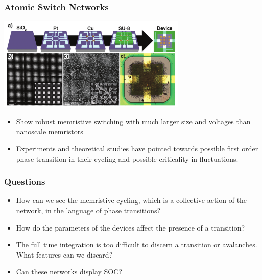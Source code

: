 \documentclass[mathserif]{beamer}
\begin{document}
\begin{frame}
\frametitle{Atomic Switch Networks}

\begin{center}
\includegraphics[width=9cm]{ASN_fabrication.png}
\end{center}
\begin{itemize}
\item Show robust memristive switching with much larger size and voltages than
nanoscale memristors
\item Experiments and theoretical studies have pointed towards possible first order phase
transition in their cycling and possible criticality in fluctuations.
\end{itemize}

\end{frame}

\begin{frame}
\frametitle{Questions}
\begin{itemize}
\item How can we see the memristive cycling, which is a collective action of the network,
in the language of phase transitions?
\item How do the parameters of the devices affect the presence of a transition?
\item The full time integration is too difficult to discern a transition or avalanches.
What features can we discard?
\item Can these networks display SOC?
\end{itemize}
\end{frame}
\end{document}
